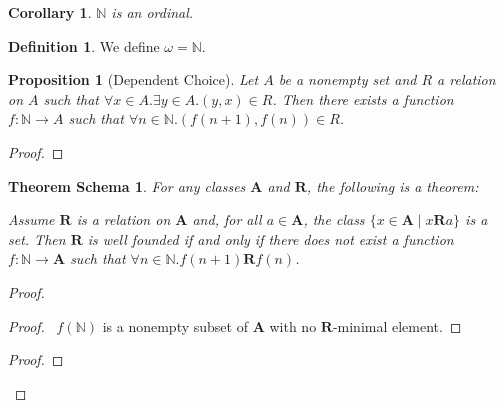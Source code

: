 \documentclass{book}
\let\qed\relax
\newtheorem{prop}[ax]{Proposition}
\newtheorem{cor}{Corollary}[ax]
\newtheorem{thms}[ax]{Theorem Schema}
\theoremstyle{definition}
\newtheorem{df}[ax]{Definition}
\begin{document}
\begin{cor}
$\mathbb{N}$ is an ordinal.
\end{cor}

\begin{df}
We define $\omega = \mathbb{N}$.
\end{df}

\begin{prop}[Dependent Choice]
Let $A$ be a nonempty set and $R$ a relation on $A$ such that $\forall x \in A. \exists y \in A. (y,x) \in R$. Then there exists a function $f : \mathbb{N} \rightarrow A$ such that $\forall n \in \mathbb{N}. (f(n+1),f(n)) \in R$.
\end{prop}

\begin{proof}
\pf
{}
\qed
\end{proof}

\begin{thms}
For any classes $\mathbf{A}$ and $\mathbf{R}$, the following is a theorem:


Assume $\mathbf{R}$ is a relation on $\mathbf{A}$ and, for all $a \in \mathbf{A}$, the class $\{ x \in \mathbf{A} \mid x \mathbf{R} a \}$ is a set. Then $\mathbf{R}$ is well founded if and only if there does not exist a function $f : \mathbb{N} \rightarrow \mathbf{A}$ such that $\forall n \in \mathbb{N}. f(n+1) \mathbf{R} f(n)$.
\end{thms}

\begin{proof}
\pf
{}
\begin{proof}
	\pf\ $f(\mathbb{N})$ is a nonempty subset of $\mathbf{A}$ with no $\mathbf{R}$-minimal element.
\end{proof}
\begin{proof}
\end{proof}
\qed
\end{proof}
\end{document}
